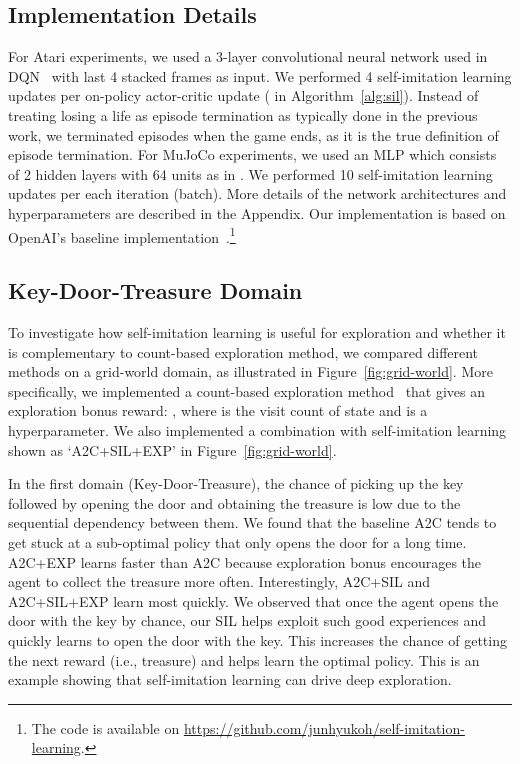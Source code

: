 \documentclass{article}
\newcommand{\supp}{the Appendix}
\newcommand{\cutsubsectionup}{\vspace*{-0.05in}}\newcommand{\cutsubsectiondown}{\vspace*{-0.05in}}
\begin{document}
\cutsubsectionup
\subsection{Implementation Details}
\cutsubsectiondown
For Atari experiments, we used a 3-layer convolutional neural network used in DQN~\citep{mnih2015human} with last 4 stacked frames as input. We performed 4 self-imitation learning updates per on-policy actor-critic update ( in Algorithm~\ref{alg:sil}). Instead of treating losing a life as episode termination as typically done in the previous work, we terminated episodes when the game ends, as it is the true definition of episode termination. 
For MuJoCo experiments, we used an MLP which consists of 2 hidden layers with 64 units as in \citet{Schulman2017ProximalPO}. We performed 10 self-imitation learning updates per each iteration (batch).
More details of the network architectures and hyperparameters are described in \supp{}. Our implementation is based on OpenAI's baseline implementation~\citep{baselines}.\footnote{The code is available on \url{https://github.com/junhyukoh/self-imitation-learning}. }

\cutsubsectionup
\subsection{Key-Door-Treasure Domain}
\cutsubsectiondown
To investigate how self-imitation learning is useful for exploration and whether it is complementary to count-based exploration method, we compared different methods on a grid-world domain, as illustrated in Figure~\ref{fig:grid-world}. More specifically, we implemented a count-based exploration method~\citep{strehl2008analysis} that gives an exploration bonus reward: , where  is the visit count of state  and  is a hyperparameter. We also implemented a combination with self-imitation learning shown as `A2C+SIL+EXP' in Figure~\ref{fig:grid-world}.


In the first domain (Key-Door-Treasure), the chance of picking up the key followed by opening the door and obtaining the treasure is low due to the sequential dependency between them. We found that the baseline A2C tends to get stuck at a sub-optimal policy that only opens the door for a long time. A2C+EXP learns faster than A2C because exploration bonus encourages the agent to collect the treasure more often. Interestingly, A2C+SIL and A2C+SIL+EXP learn most quickly. We observed that once the agent opens the door with the key by chance, our SIL helps exploit such good experiences and quickly learns to open the door with the key. This increases the chance of getting the next reward (i.e., treasure) and helps learn the optimal policy. This is an example showing that self-imitation learning can drive deep exploration. 
\end{document}
